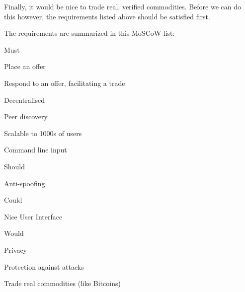 Finally, it would be nice to trade real, verified commodities.
Before we can do this however, the requirements listed above should be satisfied first.

\newpage

The requirements are summarized in this MoSCoW list:

\begin{myitemize}
\item Must
\begin{myitemize}
	\item Place an offer
	\item Respond to an offer, facilitating a trade
    \item Decentralised
    \item Peer discovery
    \item Scalable to 1000s of users
    \item Command line input
\end{myitemize}
\item Should
\begin{myitemize}
	\item Anti-spoofing
\end{myitemize}
\item Could
\begin{myitemize}
	\item Nice User Interface
\end{myitemize}
\item Would
\begin{myitemize}
	\item Privacy
	\item Protection against attacks
	\item Trade real commodities (like Bitcoins)
\end{myitemize}
\end{myitemize}